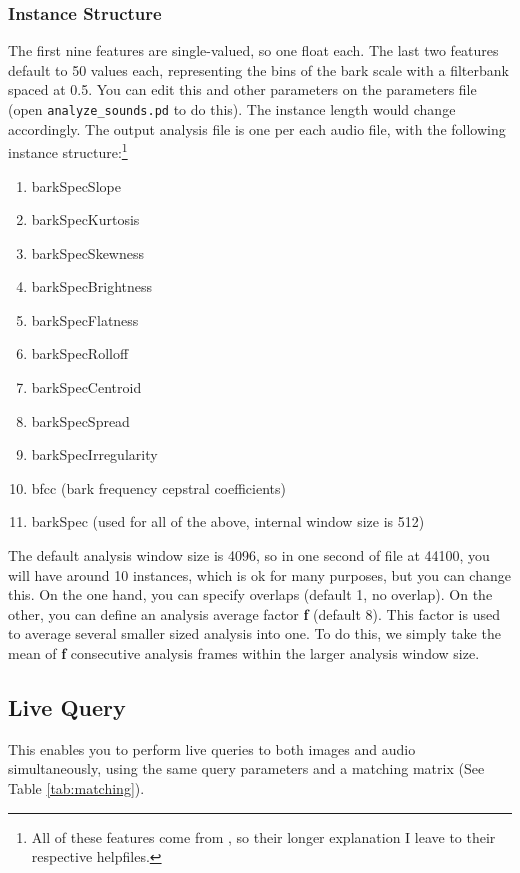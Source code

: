 \subsubsection{Instance Structure}

The first nine features are single-valued, so one float each. The last two features default to 50 values each, representing the bins of the bark scale with a filterbank spaced at 0.5. You can edit this and other parameters on the parameters file (open \texttt{analyze\_sounds.pd} to do this). The instance length would change accordingly. The output analysis file is one per each audio file, with the following instance structure:\footnote{All of these features come from , so their longer explanation I leave to their respective helpfiles.}

\begin{enumerate}
\singlespacing
\item barkSpecSlope
\item barkSpecKurtosis
\item barkSpecSkewness
\item barkSpecBrightness
\item barkSpecFlatness
\item barkSpecRolloff
\item barkSpecCentroid
\item barkSpecSpread
\item barkSpecIrregularity
\item bfcc (bark frequency cepstral coefficients)
\item barkSpec (used for all of the above, internal window size is 512)
\end{enumerate}

The default analysis window size is 4096, so in one second of file at 44100, you will have around 10 instances, which is ok for many purposes, but you can change this. On the one hand, you can specify overlaps (default 1, no overlap). On the other, you can define an analysis average factor \textbf{f} (default 8). This factor is used to average several smaller sized analysis into one. To do this, we simply take the mean of \textbf{f} consecutive analysis frames within the larger analysis window size.

\subsection{Live Query}

This enables you to perform live queries to both images and audio simultaneously, using the same query parameters and a matching matrix (See Table \ref{tab:matching}).


